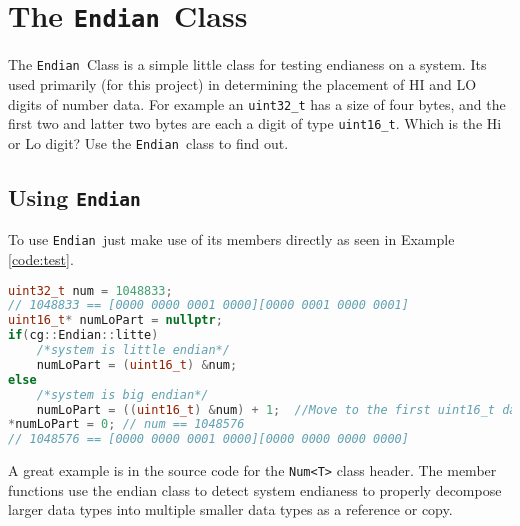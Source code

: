 \documentclass{article}
\newlength\tdima \newlength\tdimb \setlength\tdima{ \fboxsep+\fboxrule} \setlength\tdimb{-\fboxsep+\fboxrule}
\newcommand{\theobj}{\protect\Verb+Endian +}
\begin{document}
\tableofcontents




\captionsetup[lstlisting]{format=listing,labelfont=white,textfont=white}
\lstset{style=cppstyle}

\section{The \theobj Class}

The \theobj Class is a simple little class for testing endianess on a system. Its used primarily (for this project) in determining the placement of HI and LO digits of number data.  For example an \Verb+uint32_t+ has a size of four bytes, and the first two and latter two bytes are each a digit of type \Verb+uint16_t+.  Which is the Hi or Lo digit? Use the \theobj class to find out.

\subsection{Using \theobj}

To use \theobj just make use of its members directly as seen in Example \vref{code:test}.

\begin{lstlisting}[language=C++, label=code:test, caption=Testing Endianess]
uint32_t num = 1048833;  
// 1048833 == [0000 0000 0001 0000][0000 0001 0000 0001] 
uint16_t* numLoPart = nullptr; 
if(cg::Endian::litte)
	/*system is little endian*/
	numLoPart = (uint16_t) &num;
else
	/*system is big endian*/
	numLoPart = ((uint16_t) &num) + 1;  //Move to the first uint16_t data plus 1 unit of uint16_t in the significance direction.
*numLoPart = 0; // num == 1048576
// 1048576 == [0000 0000 0001 0000][0000 0000 0000 0000] 
\end{lstlisting}

A great example is in the source code for the \Verb+Num<T>+ class header. The member functions use the endian class to detect system endianess to properly decompose larger data types into multiple smaller data types as a reference or copy.
\end{document}
